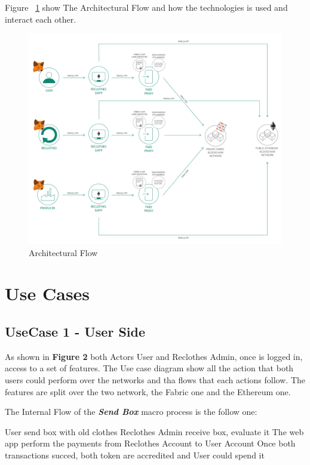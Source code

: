 {Figure ~\ref{architecturalFlow} show The Architectural Flow and how the technologies is used and interact each other.

\begin{figure}[h!]
	\centering
	\includegraphics[totalheight=13cm]{img/architectural_flow.png}
	\caption{Architectural Flow}
    \label{architecturalFlow}
\end{figure}
 
\section{Use Cases}

\subsection{UseCase 1 - User Side}

As shown in \textbf{Figure 2} both Actors User and Reclothes Admin, once is logged in, access to a set
of features. The Use case diagram show all the action that both users could perform over the networks and
tha flows that each actions follow. The features are split over the two network, the Fabric one and the 
Ethereum one. 

The Internal Flow of the \textit{\bf{Send Box}} macro process is the follow one:

\begin{outline}[enumerate]
    \1 User send box with old clothes
    \1 Reclothes Admin receive box, evaluate it
    \1 The web app perform the payments from Reclothes Account to User Account
    \1 Once both transactions succed, both token are accredited and User could spend it
\end{outline}

}
